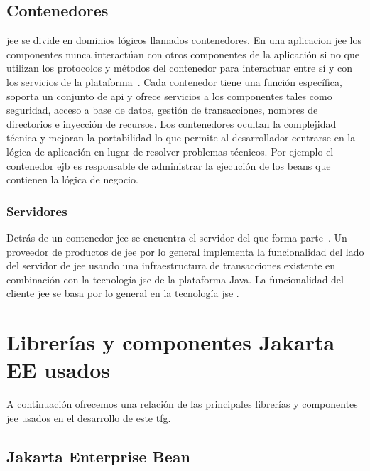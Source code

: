 \subsection{Contenedores}
\label{sec:contenedores}
\acrshort{jee} se divide en dominios lógicos llamados contenedores. En una aplicacion \acrshort{jee} los componentes nunca interactúan con otros componentes de la aplicación si no que utilizan los protocolos y métodos del contenedor para interactuar entre sí y con los servicios de la plataforma~\cite{JakartaEE}. Cada contenedor tiene una función específica, soporta un conjunto de \acrshort{api} y ofrece servicios a los componentes tales como seguridad, acceso a base de datos, gestión de transacciones, nombres de directorios e inyección de recursos. Los contenedores ocultan la complejidad técnica y mejoran la portabilidad lo que permite al desarrollador centrarse en la lógica de aplicación en lugar de resolver problemas técnicos. Por ejemplo el contenedor \acrshort{ejb} es responsable de administrar la ejecución de los beans que contienen la lógica de negocio.

\subsubsection{Servidores}
\label{sec:servidores}
Detrás de un contenedor \acrshort{jee} se encuentra el servidor del que forma parte~\cite{JakartaEE}. Un proveedor de productos de \acrshort{jee}  por lo general implementa la funcionalidad del lado del servidor de \acrshort{jee}  usando una infraestructura de transacciones existente en combinación con la tecnología \acrshort{jse} de la plataforma Java. La funcionalidad del cliente \acrshort{jee} se basa por lo general en la tecnología \acrshort{jse} .




\section{Librerías y componentes Jakarta EE usados}
\label{sec:componentesJakartaEE}

A continuación ofrecemos una relación de las principales librerías y componentes \acrshort{jee} usados en el desarrollo de este \acrshort{tfg}.

\subsection{Jakarta Enterprise Bean}
\label{sec:jeb}


